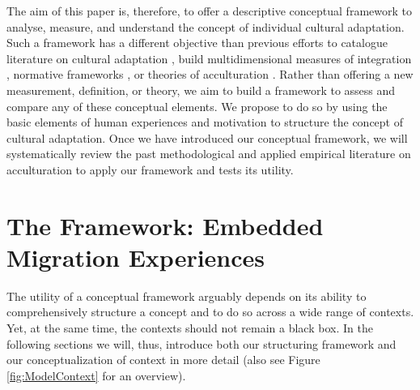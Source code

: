 \documentclass[man, 12pt, a4paper]{apa7}
\begin{document}
The aim of this paper is, therefore, to offer a descriptive conceptual framework to analyse, measure, and understand the concept of individual cultural adaptation. Such a framework has a different objective than previous efforts to catalogue literature on cultural adaptation \citep[e.g.,][]{Castels2003}, build multidimensional measures of integration \citep[e.g.,][]{Harder2018}, normative frameworks \citep[e.g.,][]{Ager2008a}, or theories of acculturation \citep[e.g.,][]{Berry2005}. Rather than offering a new measurement, definition, or theory, we aim to build a framework to assess and compare any of these conceptual elements. 
We propose to do so by using the basic elements of human experiences and motivation to structure the concept of cultural adaptation.
Once we have introduced our conceptual framework, we will systematically review the past methodological and applied empirical literature on acculturation to apply our framework and tests its utility. \\

\section{The Framework: Embedded Migration Experiences}
The utility of a conceptual framework arguably depends on its ability to comprehensively structure a concept and to do so across a wide range of contexts. Yet, at the same time, the contexts should not remain a black box. In the following sections we will, thus, introduce both our structuring framework and our conceptualization of context in more detail (also see Figure \ref{fig:ModelContext} for an overview).
\end{document}
